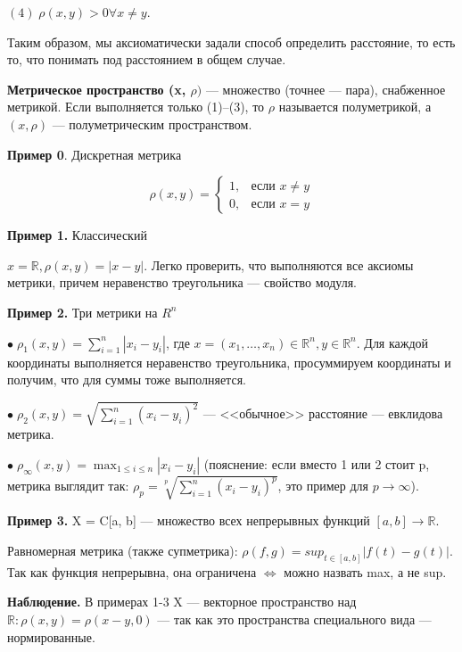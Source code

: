 \documentclass[12pt,a4paper]{article}
\begin{document}
$(4) \; \rho(x, y) > 0 \forall x \neq y$. 

Таким образом, мы аксиоматически задали способ определить расстояние, то есть то, что понимать под расстоянием в общем случае. 

\textbf{Метрическое пространство (x, $\rho)$} --- множество (точнее --- пара), снабженное метрикой. Если выполняется только (1)--(3), то $\rho$ называется полуметрикой, а $(x, \rho)$ --- полуметрическим пространством. 

\textbf{Пример 0}. Дискретная метрика

\begin{equation*}
\rho(x, y) = 
\begin{cases}
1, &\text{если $x \neq y$}\\
0, &\text{если $x = y$}
\end{cases}
\end{equation*}

\textbf{Пример 1.} Классический

$x = \mathbb{R}, \rho(x, y) = |x - y|$. Легко проверить, что выполняются все аксиомы метрики, причем неравенство треугольника --- свойство модуля. 

\textbf{Пример 2.} Три метрики на $R^n$

$\bullet \; \rho_1(x, y) = \sum_{i = 1}^{n}|x_{i} - y_{i}|$, где $x = (x_1, \ldots, x_n) \in \mathbb{R}^n, y \in \mathbb{R}^n$. Для каждой координаты выполняется неравенство треугольника, просуммируем координаты и получим, что для суммы тоже выполняется. 

$\bullet \; \rho_2(x, y) = \sqrt{\sum_{i = 1}^{n}(x_{i} - y_{i})^2}$ --- <<обычное>> расстояние --- евклидова метрика. 

$\bullet \; \rho_{\infty}(x, y) = \max_{1 \leqslant i \leqslant n} |x_{i} - y_{i}|$ (пояснение: если вместо 1 или 2 стоит p, метрика выглядит так: $\rho_{p} = \sqrt[p]{\sum_{i = 1}^{n}(x_{i} - y_{i})^{p}}$, это пример для $p \to \infty$). 

\textbf{Пример 3.} X = C[a, b] --- множество всех непрерывных функций $[a, b] \to \mathbb{R}$. 

Равномерная метрика (также супметрика): $\rho(f, g) = sup_{t \in [a, b]}|f(t) - g(t)|$. Так как функция непрерывна, она ограничена $\Leftrightarrow$ можно назвать max, а не sup. 

\textbf{Наблюдение.} В примерах 1-3 X --- векторное пространство над $\mathbb{R}: \rho(x, y) = \rho(x - y, 0)$ --- так как это пространства специального вида --- нормированные. 
\end{document}
